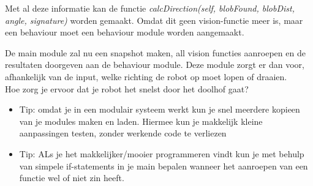 \documentclass[a4paper]{article}
\begin{document}
Met al deze informatie kan de functie \textit{calcDirection(self, blobFound, blobDist, angle, signature)} worden gemaakt. Omdat dit geen vision-functie meer is, maar een behaviour moet een behaviour module worden aangemaakt.

De main module zal nu een snapshot maken, all vision functies aanroepen en de resultaten doorgeven aan de behaviour module. Deze module zorgt er dan voor, afhankelijk van de input, welke richting de robot op moet lopen of draaien. 
\\

Hoe zorg je ervoor dat je robot het snelst door het doolhof gaat?

\begin{itemize}
\item Tip: omdat je in een modulair systeem werkt kun je snel meerdere kopieen van je modules maken en laden. Hiermee kun je makkelijk kleine aanpassingen testen, zonder werkende code te verliezen
\item Tip: ALs je het makkelijker/mooier programmeren vindt kun je met behulp van simpele if-statements in je main bepalen wanneer het aanroepen van een functie wel of niet zin heeft.
\end{itemize}
\end{document}
